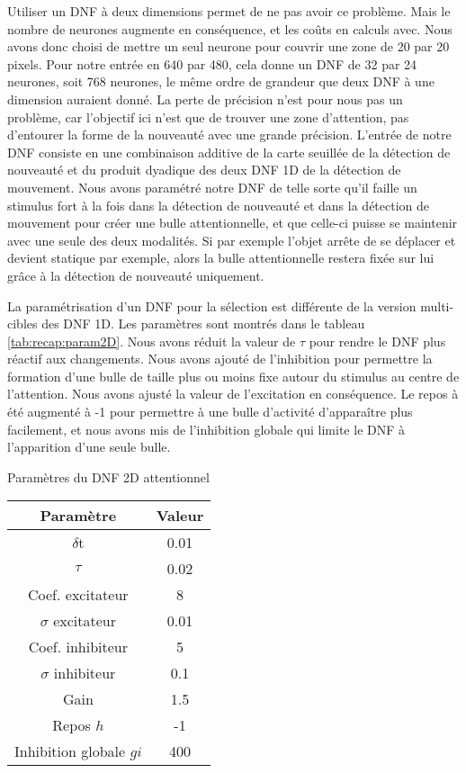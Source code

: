 	Utiliser un DNF à deux dimensions permet de ne pas avoir ce problème. Mais le nombre de neurones augmente en conséquence, et les coûts en calculs avec. Nous avons donc choisi de mettre un seul neurone pour couvrir une zone de 20 par 20 pixels. Pour notre entrée en 640 par 480, cela donne un DNF de 32 par 24 neurones, soit 768 neurones, le même ordre de grandeur que deux DNF à une dimension auraient donné. La perte de précision n'est pour nous pas un problème, car l'objectif ici n'est que de trouver une zone d'attention, pas d'entourer la forme de la nouveauté avec une grande précision. L'entrée de notre DNF consiste en une combinaison additive de la carte seuillée de la détection de nouveauté et du produit dyadique des deux DNF 1D de la détection de mouvement. Nous avons paramétré notre DNF de telle sorte qu'il faille un stimulus fort à la fois dans la détection de nouveauté et dans la détection de mouvement pour créer une bulle attentionnelle, et que celle-ci puisse se maintenir avec une seule des deux modalités. Si par exemple l'objet arrête de se déplacer et devient statique par exemple, alors la bulle attentionnelle restera fixée sur lui grâce à la détection de nouveauté uniquement.

	La paramétrisation d'un DNF pour la sélection est différente de la version multi-cibles des DNF 1D. Les paramètres sont montrés dans le tableau \ref{tab:recap:param2D}. Nous avons réduit la valeur de $\tau$ pour rendre le DNF plus réactif aux changements. Nous avons ajouté de l'inhibition pour permettre la formation d'une bulle de taille plus ou moins fixe autour du stimulus au centre de l'attention. Nous avons ajusté la valeur de l'excitation en conséquence. Le repos à été augmenté à -1 pour permettre à une bulle d'activité d'apparaître plus facilement, et nous avons mis de l'inhibition globale qui limite le DNF à l'apparition d'une seule bulle.

	\begin{tableth}
	\caption{Paramètres du DNF 2D attentionnel}
	\begin{tabular}{|c|c|}
		\hline
		Paramètre & Valeur\\
		\hline
		$\delta$t & 0.01 \\
		$\tau$ & 0.02 \\
		Coef. excitateur & 8 \\
		$\sigma$ excitateur & 0.01 \\
		Coef. inhibiteur & 5 \\
		$\sigma$ inhibiteur & 0.1 \\
		Gain & 1.5 \\
		Repos $h$ & -1 \\
		Inhibition globale $gi$ & 400 \\
		\hline
	\end{tabular}
	\label{tab:recap:param2D}
	\end{tableth}

